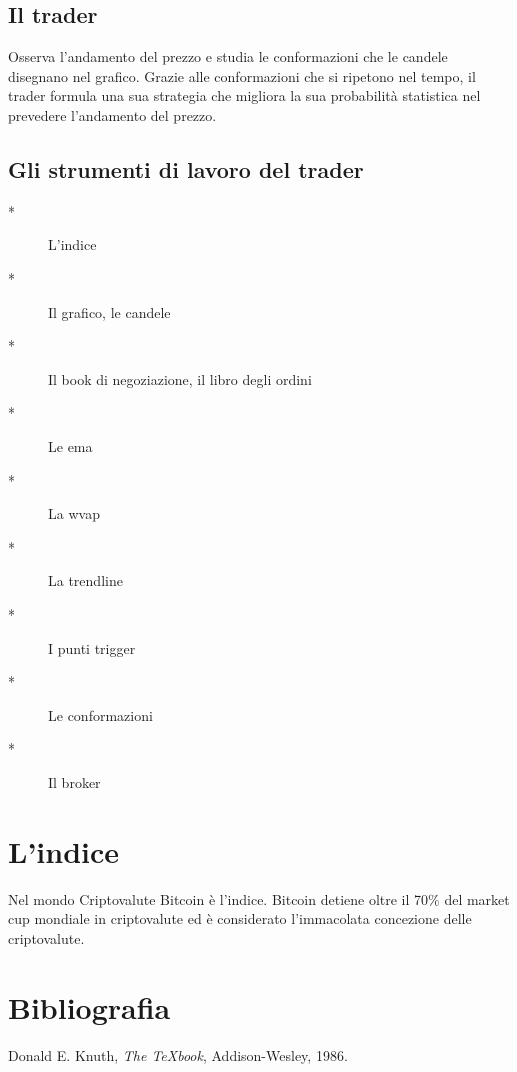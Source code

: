 \documentclass[12pt]{book}
\begin{document}
\section{Il trader} 
Osserva l'andamento del prezzo e studia le conformazioni che le candele disegnano nel grafico. Grazie alle conformazioni che si ripetono nel tempo, il trader formula una sua strategia che migliora la sua probabilità statistica nel prevedere l'andamento del prezzo.

\section{Gli strumenti di lavoro del trader}
\begin{description}
    \item[*] L'indice
    \item[*] Il grafico, le candele
    \item[*] Il book di negoziazione, il libro degli ordini
    \item[*] Le ema
    \item[*] La wvap
    \item[*] La trendline
    \item[*] I punti trigger
    \item[*] Le conformazioni
    \item[*] Il broker
\end{description}




\chapter{L'indice}
Nel mondo Criptovalute Bitcoin è l'indice. Bitcoin detiene oltre il 70\% del market cup mondiale in criptovalute ed è considerato l'immacolata concezione delle criptovalute. 



\newpage
\chapter*{Bibliografia}
\begin{thebibliography}{9}
 Donald E. Knuth, \textit{The TeXbook}, Addison-Wesley, 1986.
\end{thebibliography}
\end{document}
